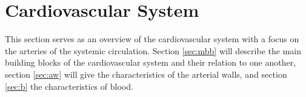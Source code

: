 \documentclass[a4paper, oneside]{discothesis}
\begin{document}







\chapter{Cardiovascular System} \label{chap:cvs}
This section serves as an overview of the cardiovascular system with a focus on the arteries of the systemic circulation. 
Section \ref{sec:mbb} will describe the main building blocks of the cardiovascular system and their relation to one another, section \ref{sec:aw} will give the characteristics of the arterial walls, and section \ref{sec:b} the characteristics of blood.
\end{document}
